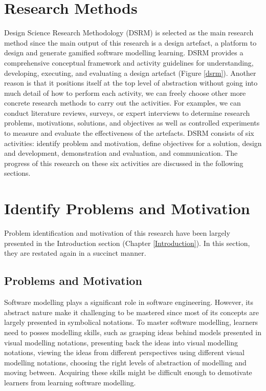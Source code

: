 \documentclass[12pt, a4paper]{report} \usepackage[titletoc]{appendix}
\begin{document}
\section{Research Methods}
\label{Research Methods}
Design Science Research Methodology (DSRM) is selected as the main research method since the main output of this research is a design artefact, a platform to design and generate gamified software modelling learning. DSRM provides a comprehensive conceptual framework and activity guidelines for understanding, developing, executing, and evaluating a design artefact (Figure \ref{dsrm}). Another reason is that it positions itself at the top level of abstraction without going into much detail of how to perform each activity, we can freely choose other more concrete research methods to carry out the activities. For examples, we can conduct literature reviews, surveys, or expert interviews to determine research problems, motivations, solutions, and objectives as well as controlled experiments to measure and evaluate the effectiveness of the artefacts. DSRM consists of six activities: identify problem and motivation, define objectives for a solution, design and development, demonstration and evaluation, and communication. The progress of this research on these six activities are discussed in the following sections.

\section{Identify Problems and Motivation}
Problem identification and motivation of this research have been largely presented in the Introduction section (Chapter \ref{Introduction}). In this section, they are restated again in a succinct manner.   

\subsection{Problems and Motivation}
Software modelling plays a significant role in software engineering. However, its abstract nature make it challenging to be mastered since most of its concepts are largely presented in symbolical notations. To master software modelling, learners need to posses modelling skills, such as grasping ideas behind models presented in visual modelling notations, presenting back the ideas into visual modelling notations, viewing the ideas from different perspectives using different visual modelling notations, choosing the right levels of abstraction of modelling and moving between. Acquiring these skills might be difficult enough to demotivate learners from learning software modelling.
\end{document}
